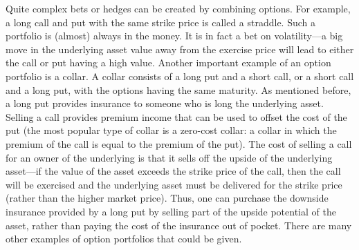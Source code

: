 Quite complex bets or hedges can be created by combining options.  For example, a long call and put with the same strike price is called a straddle.   Such a portfolio is (almost) always in the money.  It is in fact a bet on volatility---a big move in the underlying asset value away from the exercise price will lead to either the call or put having a high value.  Another important example of an option portfolio is a collar.   A collar consists of a long put and a short call, or a short call and a long put, with the options having the same maturity.  As mentioned before, a long put provides insurance to someone who is long the underlying asset.  Selling a call provides premium income that can be used to offset the cost of the put (the most popular type of collar is a zero-cost collar:  a collar in which the premium of the call is equal to the premium of the put).  The cost of selling a call for an owner of the underlying is that it sells off the upside of the underlying asset---if the value of the asset exceeds the strike price of the call, then the call will be exercised and the underlying asset must be delivered for the strike price (rather than the higher market price).  Thus, one can purchase the downside insurance provided by a long put by selling part of the upside potential of the asset, rather than paying the cost of the insurance out of pocket.  There are many other examples of option portfolios that could be given.  

